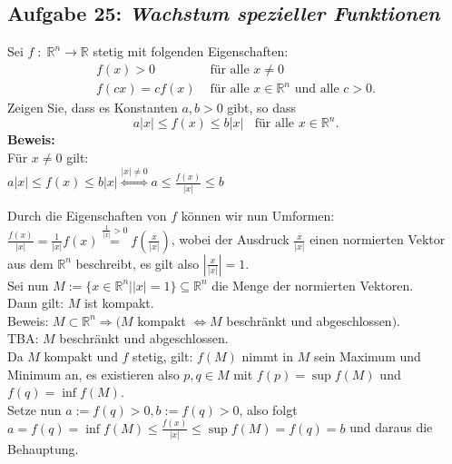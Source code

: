 \subsection*{Aufgabe 25: \mdseries\itshape Wachstum spezieller Funktionen}
Sei $f \; : \; \mathbb{R}^n \rightarrow \mathbb{R}$ stetig mit folgenden Eigenschaften:
    $$\begin{array}{rl}
        f(x) > 0 & \text{ für alle } x\not= 0\\
        f(cx) = c f(x) & \text{ für alle } x\in \mathbb{R}^n \text{ und alle }c > 0.
    \end{array}$$
    Zeigen Sie, dass es Konstanten $a,b > 0$ gibt, so dass
    $$
        a|x| \leq f(x) \leq b|x| \; \; \text{ für alle } x \in \mathbb{R}^n.
    $$
\textbf{Beweis:}\\
    Für $x \neq 0$ gilt: \\
    $a |x| \leq f(x) \leq b|x| \stackrel{|x| \neq 0}{\Leftrightarrow} a \leq \frac{f(x)}{|x|} \leq b$

    Durch die Eigenschaften von $f$ können wir nun Umformen: \\
    $\frac{f(x)}{|x|} = \frac{1}{|x|} f(x) \stackrel{\frac{1}{|x|} > 0}{=}
    f(\frac{x}{|x|})$, wobei der Ausdruck $\frac{x}{|x|}$ einen normierten Vektor
    aus dem $\mathbb{R}^n$ beschreibt, es gilt also $| \frac{x}{|x|} | = 1$. \\
    
    Sei nun $M := \{x \in \mathbb{R}^n | |x| = 1 \} \subseteq \mathbb{R}^n$ 
    die Menge der normierten Vektoren.\\
    Dann gilt: $M$ ist kompakt. \\
    Beweis: $M \subset \mathbb{R}^n \Rightarrow (M$ kompakt 
    $\Leftrightarrow M$ beschränkt und abgeschlossen$)$. \\
    TBA: $M$ beschränkt und abgeschlossen. \\

    Da $M$ kompakt und $f$ stetig, gilt: $f(M)$ nimmt in $M$ sein Maximum und Minimum an, es existieren also $p,q \in M$ mit $f(p) = \sup f(M)$ und $f(q) = \inf f(M)$. \\
    Setze nun $a := f(q) > 0, b := f(q) > 0$, also folgt \\
    $ a = f(q) = \inf f(M) \leq \frac{f(x)}{|x|} \leq \sup f(M) = f(q) = b $ und daraus die Behauptung.
